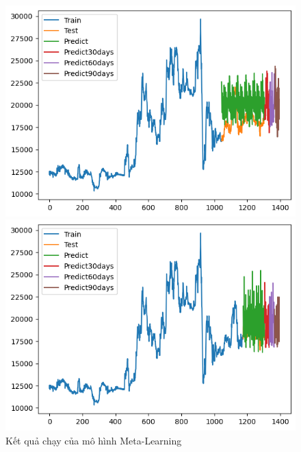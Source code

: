 \begin{figure}[H]
\begin{minipage}{0.15\textwidth}
    \end{minipage}
    \hfill
    \begin{minipage}{0.15\textwidth}
    \centering
    \includegraphics[width=1\textwidth]{resources/chapter-5/newdata1/result/EXB_ML_8_2.png}
    \end{minipage}
    \hfill
        \begin{minipage}{0.15\textwidth}
    \centering
    \includegraphics[width=1\textwidth]{resources/chapter-5/newdata1/result/EXB_ML_9_1.png}
    \end{minipage}
    \hfill
    
    \caption{Kết quả chạy của mô hình Meta-Learning}
    \label{fig:ml_result}
\end{figure}


